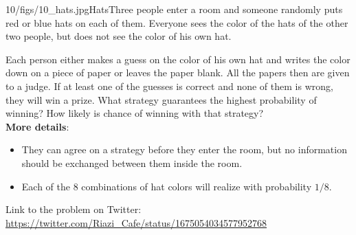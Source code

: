 \begin{problem}{10/figs/10_hats.jpg}{Hats}Three people enter a room and someone randomly puts red or blue hats on each of them. Everyone sees the color of the hats of the other two people, but does not see the color of his own hat.

Each person either makes a guess on the color of his own hat and writes the color down on a piece of paper or leaves the paper blank. All the papers then are given to a judge. If at least one of the guesses is correct and none of them is wrong, they will win a  prize. What strategy guarantees the highest probability of winning? How likely is chance of winning with that strategy?\\[0.2cm]

\textbf{More details}:
\begin{itemize}
\item They can agree on a strategy before they enter the room, but no information should be exchanged between them inside the room.
\item Each of the 8 combinations of hat colors will realize with probability $1/8$.
\end{itemize}

Link to the problem on Twitter:  \url{https://twitter.com/Riazi_Cafe/status/1675054034577952768}\end{problem}